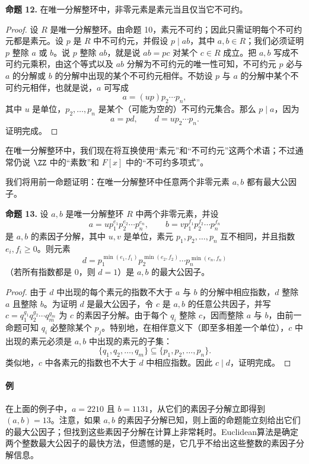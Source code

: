 \medskip
\noindent\textbf{命题 12.}
在唯一分解整环中，非零元素是素元当且仅当它不可约。

\begin{proof}
	设 $R$ 是唯一分解整环。由命题 10，素元不可约；因此只需证明每个不可约元都是素元。设 $p$ 是 $R$ 中不可约元，并假设 $p\mid ab$，其中 $a,b\in R$；我们必须证明 $p$ 整除 $a$ 或 $b$。说 $p$ 整除 $ab$，就是说 $ab=pc$ 对某个 $c\in R$ 成立。把 $a,b$ 写成不可约元乘积，由这个等式以及 $ab$ 分解为不可约元的唯一性可知，不可约元 $p$ 必与 $a$ 的分解或 $b$ 的分解中出现的某个不可约元相伴。不妨设 $p$ 与 $a$ 的分解中某个不可约元相伴，也就是说，$a$ 可写成
	\[
	a=(up)p_2\cdots p_n,
	\]
	其中 $u$ 是单位，$p_2,\ldots,p_n$ 是某个（可能为空的）不可约元集合。那么 $p\mid a$，因为
	\[
	a=pd,
	\qquad d=up_2\cdots p_n.
	\]
	证明完成。
\end{proof}

在唯一分解整环中，我们现在将互换使用“素元”和“不可约元”这两个术语；不过通常仍说 $\ZZ$ 中的“素数”和 $F[x]$ 中的“不可约多项式”。

我们将用前一命题证明：在唯一分解整环中任意两个非零元素 $a,b$ 都有最大公因子。

\medskip
\noindent\textbf{命题 13.}
设 $a,b$ 是唯一分解整环 $R$ 中两个非零元素，并设
\[
a=u p_1^{e_1}p_2^{e_2}\cdots p_n^{e_n},
\qquad
b=v p_1^{f_1}p_2^{f_2}\cdots p_n^{f_n}
\]
是 $a,b$ 的素因子分解，其中 $u,v$ 是单位，素元 $p_1,p_2,\ldots,p_n$ 互不相同，并且指数 $e_i,f_i\geq0$。则元素
\[
d=p_1^{\min(e_1,f_1)}p_2^{\min(e_2,f_2)}\cdots p_n^{\min(e_n,f_n)}
\]
（若所有指数都是 $0$，则 $d=1$）是 $a,b$ 的最大公因子。

\begin{proof}
	由于 $d$ 中出现的每个素元的指数不大于 $a$ 与 $b$ 的分解中相应指数，$d$ 整除 $a$ 且整除 $b$。为证明 $d$ 是最大公因子，令 $c$ 是 $a,b$ 的任意公共因子，并写 $c=q_1^{g_1}q_2^{g_2}\cdots q_m^{g_m}$ 为 $c$ 的素因子分解。由于每个 $q_i$ 整除 $c$，因而整除 $a$ 与 $b$，由前一命题可知 $q_i$ 必整除某个 $p_j$。特别地，在相伴意义下（即至多相差一个单位），$c$ 中出现的素元必须是 $a,b$ 中出现的素元的子集：
	\[
	\{q_1,q_2,\ldots,q_m\}\subseteq\{p_1,p_2,\ldots,p_n\}.
	\]
	类似地，$c$ 中各素元的指数也不大于 $d$ 中相应指数。因此 $c\mid d$，证明完成。
\end{proof}

\paragraph{例}
在上面的例子中，$a=2210$ 且 $b=1131$，从它们的素因子分解立即得到 $(a,b)=13$。注意，如果 $a,b$ 的素因子分解已知，则上面的命题能立刻给出它们的最大公因子；但找到这些素因子分解在计算上非常耗时。Euclidean算法是确定两个整数最大公因子的最快方法，但遗憾的是，它几乎不给出这些整数的素因子分解信息。

